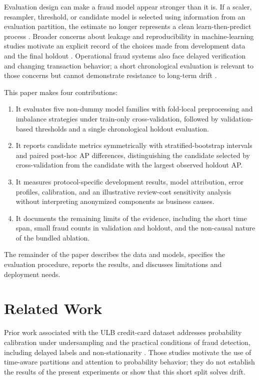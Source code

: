 \documentclass[journal]{IEEEtran}
\begin{document}
Evaluation design can make a fraud model appear stronger than it is. If a scaler, resampler, threshold, or candidate model is selected using information from an evaluation partition, the estimate no longer represents a clean learn-then-predict process \cite{kaufman2012}. Broader concerns about leakage and reproducibility in machine-learning studies motivate an explicit record of the choices made from development data and the final holdout \cite{kapoor2022}. Operational fraud systems also face delayed verification and changing transaction behavior; a short chronological evaluation is relevant to those concerns but cannot demonstrate resistance to long-term drift \cite{dalpozzo2018}.

This paper makes four contributions:
\begin{enumerate}
  \item It evaluates five non-dummy model families with fold-local preprocessing and imbalance strategies under train-only cross-validation, followed by validation-based thresholds and a single chronological holdout evaluation.
  \item It reports candidate metrics symmetrically with stratified-bootstrap intervals and paired post-hoc AP differences, distinguishing the candidate selected by cross-validation from the candidate with the largest observed holdout AP.
  \item It measures protocol-specific development results, model attribution, error profiles, calibration, and an illustrative review-cost sensitivity analysis without interpreting anonymized components as business causes.
  \item It documents the remaining limits of the evidence, including the short time span, small fraud counts in validation and holdout, and the non-causal nature of the bundled ablation.
\end{enumerate}
The remainder of the paper describes the data and models, specifies the evaluation procedure, reports the results, and discusses limitations and deployment needs.
\FloatBarrier

\section{Related Work}
\label{sec:related}
Prior work associated with the ULB credit-card dataset addresses probability calibration under undersampling and the practical conditions of fraud detection, including delayed labels and non-stationarity \cite{dalpozzo2015,dalpozzo2018}. Those studies motivate the use of time-aware partitions and attention to probability behavior; they do not establish the results of the present experiments or show that this short split solves drift.
\end{document}
